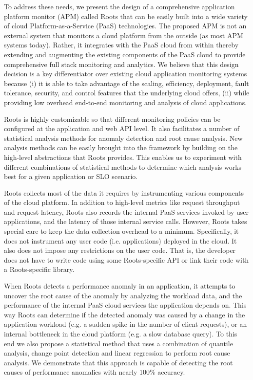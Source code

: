 To address these needs, we present the design of 
a comprehensive application platform 
monitor (APM) called Roots that can be easily built into a wide variety of cloud Platform-as-a-Service 
(PaaS) technologies. The proposed
APM is not an external system that monitors a cloud platform from the outside (as most APM systems today). 
Rather, it integrates with
the PaaS cloud from within thereby extending and augmenting the existing components of the PaaS cloud
to provide comprehensive full stack monitoring and analytics. 
We believe that this design decision is a key differentiator over existing cloud 
application monitoring systems because (i) it is
able to take advantage of the scaling, efficiency, deployment, fault tolerance, security, 
and control features that the underlying cloud offers, 
(ii) while providing low overhead end-to-end monitoring and analysis of cloud applications.

Roots is highly customizable so that different monitoring policies can be
configured at the application and web API level. It also facilitates a number of statistical analysis
methods for anomaly detection and root cause analysis. New analysis methods
can be easily brought into the framework by building on the high-level abstractions
that Roots provides. This enables us to experiment with different combinations of
statistical methods to determine which analysis works best for a given application or
SLO scenario. 

Roots collects most of the data it requires by instrumenting 
various components of the cloud platform. In addition to high-level metrics like request throughput
and request latency, Roots also records the internal PaaS services invoked by user applications,
and the latency of those internal service calls. However, Roots takes special care to keep the data
collection overhead to a minimum. Specifically, it does not instrument any user code (i.e. applications)
deployed in the cloud. It also does not impose any restrictions on the user code.
That is, the developer does not have to write code using some Roots-specific API or link their
code with a Roots-specific library.

When Roots detects a performance anomaly in an application, it attempts to uncover the
root cause of the anomaly by analyzing the workload data,
and the performance of the internal PaaS cloud services the application depends on. 
This way Roots can determine if the detected anomaly was caused by a change in the
application workload (e.g. a sudden spike in the number of client requests), or an internal
bottleneck in the cloud platform (e.g. a slow database query). To this end we also propose
a statistical method that uses a combination of quantile analysis, change point detection
and linear regression to perform root cause analysis. We demonstrate that this approach is
capable of detecting the root causes of performance anomalies with nearly 100\% accuracy. 

